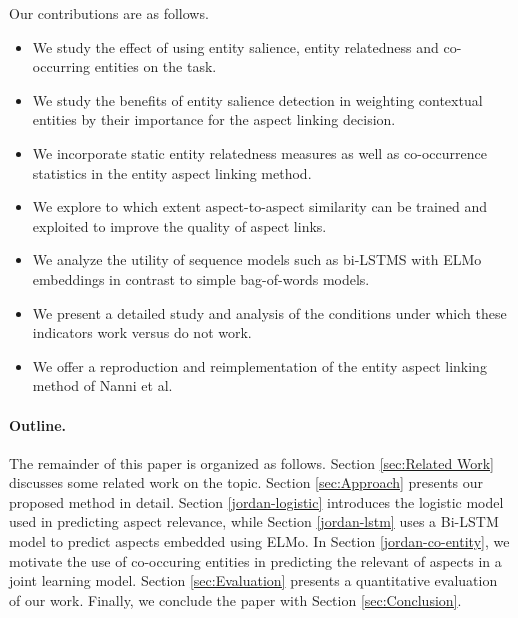 Our contributions are as follows.
\begin{itemize}

    \item We study the effect of using entity salience, entity relatedness and co-occurring entities on the task.
    \item We study the benefits of entity salience detection in weighting contextual entities by their importance for the aspect linking decision. 
    \item We incorporate static entity relatedness measures as well as co-occurrence statistics in the entity aspect linking method.
    \item We explore to which extent aspect-to-aspect similarity can be trained and exploited to improve the quality of aspect links. 
    \item We analyze the utility of sequence models such as bi-LSTMS with ELMo embeddings in contrast to simple bag-of-words models.
    \item We present a detailed study and analysis of the conditions under which these indicators work versus do not work. 
    \item We offer a reproduction and reimplementation of the entity aspect linking method of Nanni et al.
\end{itemize}

\paragraph{\textbf{Outline.}} The remainder of this paper is organized as follows. Section \ref{sec:Related Work} discusses some related work on the topic. Section \ref{sec:Approach} presents our proposed method in detail. Section \ref{jordan-logistic} introduces the logistic model used in predicting aspect relevance, while Section \ref{jordan-lstm} uses a Bi-LSTM model to predict aspects embedded using ELMo. In Section \ref{jordan-co-entity}, we motivate the use of co-occuring entities in predicting the relevant of aspects in a joint learning model.  Section \ref{sec:Evaluation} presents a quantitative evaluation of our work. Finally, we conclude the paper with Section \ref{sec:Conclusion}.
